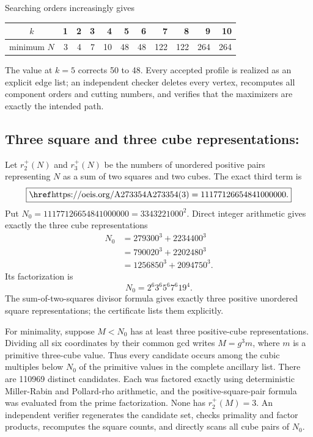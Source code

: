 Searching orders increasingly gives
\begin{center}
\begin{tabular}{@{}c*{10}{r}@{}}
\toprule
\(k\) & 1 & 2 & 3 & 4 & 5 & 6 & 7 & 8 & 9 & 10 \\
\midrule
minimum \(N\) & 3 & 4 & 7 & 10 & 48 & 48 & 122 & 122 & 264 & 264 \\
\bottomrule
\end{tabular}
\end{center}
The value at \(k=5\) corrects 50 to 48.  Every accepted profile is realized as
an explicit edge list; an independent checker deletes every vertex,
recomputes all component orders and cutting numbers, and verifies that the
maximizers are exactly the intended path.

\subsection{Three square and three cube representations: \texorpdfstring{}{A273354}}

Let \(r_2^+(N)\) and \(r_3^+(N)\) be the numbers of unordered positive pairs
representing \(N\) as a sum of two squares and two cubes.  The exact third term
is
\begin{equation}
 \boxed{\seq{A273354}(3)=11177126654841000000.}
 \label{eq:a273354-value}
\end{equation}
Put \(N_0=11177126654841000000=3343221000^2\).  Direct integer arithmetic gives
exactly the three cube representations
\begin{align*}
N_0&=279300^3+2234400^3\\
   &=790020^3+2202480^3\\
   &=1256850^3+2094750^3.
\end{align*}
Its factorization is
\[
 N_0=2^6 3^6 5^6 7^6 19^4.
\]
The sum-of-two-squares divisor formula gives exactly three positive unordered
square representations; the certificate lists them explicitly.

For minimality, suppose \(M<N_0\) has at least three positive-cube
representations.  Dividing all six coordinates by their common gcd writes
\(M=g^3m\), where \(m\) is a primitive three-cube value.  Thus every candidate
occurs among the cubic multiples below \(N_0\) of the primitive values in the
complete  ancillary list.  There are 110969 distinct candidates.
Each was factored exactly using deterministic Miller-Rabin and Pollard-rho
arithmetic, and the positive-square-pair formula was evaluated from the prime
factorization.  None has \(r_2^+(M)=3\).  An independent verifier regenerates
the candidate set, checks primality and factor products, recomputes the square
counts, and directly scans all cube pairs of \(N_0\).

